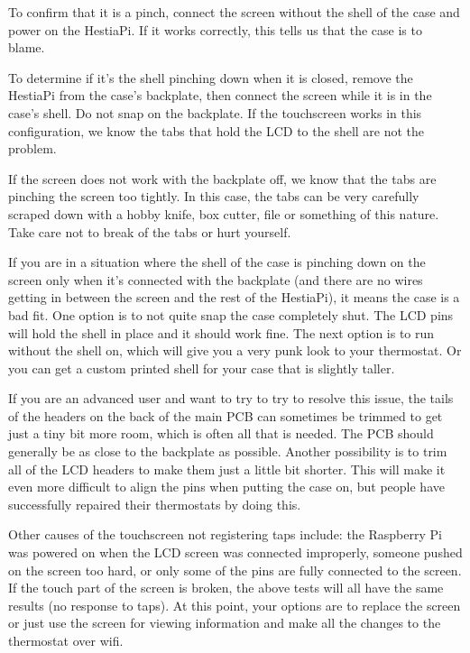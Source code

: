 To confirm that it is a pinch, connect the screen without the shell of the case
and power on the HestiaPi. If it works correctly, this tells us that the case
is to blame.

To determine if it's the shell pinching down when it is closed, remove the
HestiaPi from the case's backplate, then connect the screen while it is in the
case's shell. Do not snap on the backplate. If the touchscreen works in this
configuration, we know the tabs that hold the LCD to the shell are not the
problem.

If the screen does not work with the backplate off, we know that the tabs are
pinching the screen too tightly. In this case, the tabs can be very carefully
scraped down with a hobby knife, box cutter, file or something of this nature.
Take care not to break of the tabs or hurt yourself.

If you are in a situation where the shell of the case is pinching down on the
screen only when it's connected with the backplate (and there are no wires
getting in between the screen and the rest of the HestiaPi), it means the case
is a bad fit. One option is to not quite snap the case completely shut. The LCD
pins will hold the shell in place and it should work fine. The next option is
to run without the shell on, which will give you a very punk look to your
thermostat. Or you can get a custom printed shell for your case that is slightly
taller.

If you are an advanced user and want to try to try to resolve this issue, the
tails of the headers on the back of the main PCB can sometimes be trimmed to
get just a tiny bit more room, which is often all that is needed. The PCB
should generally be as close to the backplate as possible. Another possibility
is to trim all of the LCD headers to make them just a little bit shorter. This
will make it even more difficult to align the pins when putting the case on,
but people have successfully repaired their thermostats by doing this.

Other causes of the touchscreen not registering taps include: the Raspberry Pi
was powered on when the LCD screen was connected improperly, someone pushed on
the screen too hard, or only some of the pins are fully connected to the
screen. If the touch part of the screen is broken, the above tests will all
have the same results (no response to taps). At this point, your options are to
replace the screen or just use the screen for viewing information and make all
the changes to the thermostat over wifi.

